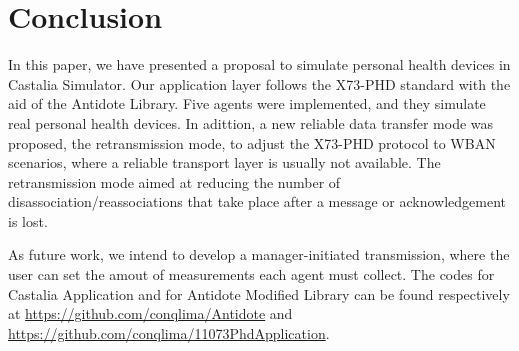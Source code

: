 \section{Conclusion}\label{conclusion}
In this paper, we have presented a proposal to simulate personal health devices in Castalia Simulator. Our application layer follows the X73-PHD standard with the aid of the Antidote Library. Five agents were implemented, and they simulate real personal health devices. In adittion, a new reliable data transfer mode was proposed, the retransmission mode, to adjust the X73-PHD protocol to WBAN scenarios, where a reliable transport layer is usually not available. The retransmission mode aimed at reducing the number of disassociation/reassociations that take place after a message or acknowledgement is lost.

As future work, we intend to develop a manager-initiated transmission, where the user can set the amout of measurements each agent must collect. The codes for Castalia Application and for Antidote Modified Library can be found respectively at \url{https://github.com/conqlima/Antidote} and \url{https://github.com/conqlima/11073PhdApplication}.

